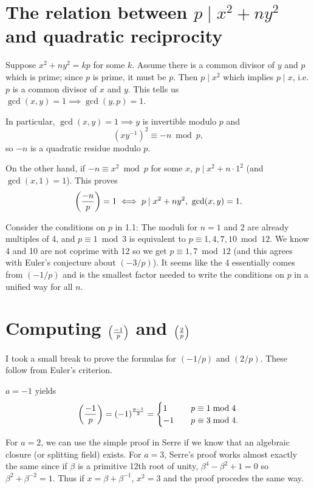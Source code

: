 

\section{The relation between $p\mid x^2+ny^2$ and quadratic reciprocity}
Suppose $x^2 + ny^2 = kp$ for some $k$. Assume there is a common divisor of $y$ and $p$ which is prime; since $p$ is prime, it must be $p$.
Then $p\mid x^2$ which implies $p\mid x$, i.e. $p$ is a common divisor of $x$ and $y$.
This tells us $\gcd(x,y)=1 \implies \gcd(y,p)=1$.

In particular, $\gcd(x,y)=1\implies y$ is invertible modulo $p$ and
\[(xy^{-1})^2\equiv -n\bmod p,\]
so $-n$ is a quadratic residue modulo $p$.

On the other hand, if $-n\equiv x^2\bmod p$ for some $x$, $p \mid x^2+n\cdot 1^2$ (and $\gcd(x,1)=1$). This proves
\[\left(\frac{-n}{p}\right)=1 \iff p\mid x^2+ny^2,\ \gcd(x,y)=1.\]

Consider the conditions on $p$ in 1.1: The moduli for $n=1$ and 2 are already multiples of 4, and $p\equiv1\bmod 3$ is equivalent to $p\equiv 1, 4, 7, 10\bmod 12$. We know 4 and 10 are not coprime with 12 so we get $p\equiv 1, 7\bmod 12$ (and this agrees with Euler's conjecture about $(-3/p)$). It seems like the 4 essentially comes from $(-1/p)$ and is the smallest factor needed to write the conditions on $p$ in a unified way for all $n$.

\section{Computing $\left(\frac{-1}{p}\right)$ and $\left(\frac{2}{p}\right)$}

I took a small break to prove the formulas for $(-1/p)$ and $(2/p)$. These follow from Euler's criterion.

$a=-1$ yields
\[\left(\frac{-1}{p}\right) = (-1)^\frac{p-1}{2} =
  \begin{cases}
     1 &\quad p\equiv 1\bmod 4\\
    -1 &\quad p\equiv 3\bmod 4.
  \end{cases}
\]

For $a=2$, we can use the simple proof in Serre if we know that an algebraic closure (or splitting field) exists. For $a=3$, Serre's proof works almost exactly the same since if $\beta$ is a primitive 12th root of unity, $\beta^4-\beta^2+1=0$ so $\beta^2 + \beta^{-2} = 1$. Thus if $x=\beta + \beta^{-1}$, $x^2 = 3$ and the proof procedes the same way.


